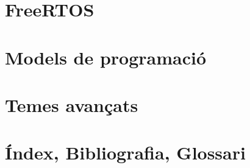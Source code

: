 \part{FreeRTOS}
\label{part:freertos}


\part{Models de programació}
\label{part:modelsprogramacio}


\part{Temes avançats}
\label{part:avançats}


% 

\part{Índex, Bibliografia, Glossari}




